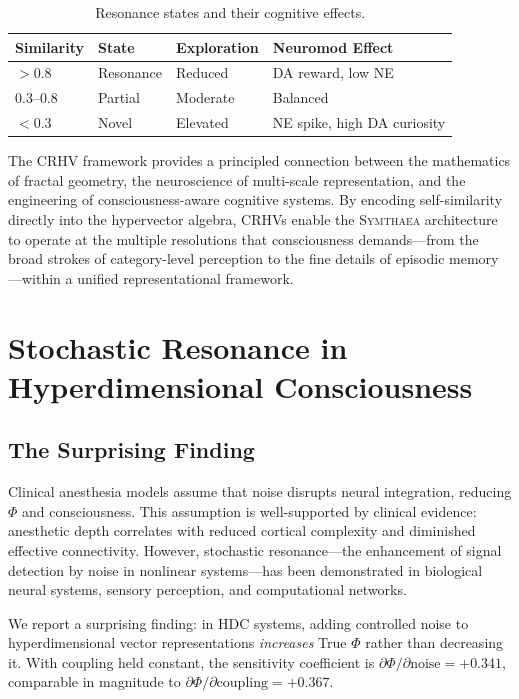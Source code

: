 \documentclass[12pt]{book}
\newcommand{\symthaea}{\textsc{Symthaea}}
\begin{document}
\begin{table}[htbp]
\centering
\caption{Resonance states and their cognitive effects.}
\label{tab:resonance-states}
\begin{tabular}{@{}llll@{}}
\toprule
\textbf{Similarity} & \textbf{State} & \textbf{Exploration} & \textbf{Neuromod Effect} \\
\midrule
$> 0.8$        & Resonance  & Reduced     & DA reward, low NE \\
$0.3$--$0.8$   & Partial    & Moderate    & Balanced \\
$< 0.3$        & Novel      & Elevated    & NE spike, high DA curiosity \\
\bottomrule
\end{tabular}
\end{table}

The CRHV framework provides a principled connection between the mathematics of fractal geometry, the neuroscience of multi-scale representation, and the engineering of consciousness-aware cognitive systems. By encoding self-similarity directly into the hypervector algebra, CRHVs enable the \symthaea{} architecture to operate at the multiple resolutions that consciousness demands---from the broad strokes of category-level perception to the fine details of episodic memory---within a unified representational framework.


\chapter{Stochastic Resonance in Hyperdimensional Consciousness}
\label{ch:sr}

\section{The Surprising Finding}

Clinical anesthesia models assume that noise disrupts neural integration, reducing $\Phi$ and consciousness. This assumption is well-supported by clinical evidence: anesthetic depth correlates with reduced cortical complexity and diminished effective connectivity. However, stochastic resonance---the enhancement of signal detection by noise in nonlinear systems---has been demonstrated in biological neural systems, sensory perception, and computational networks.

We report a surprising finding: in HDC systems, adding controlled noise to hyperdimensional vector representations \textit{increases} True $\Phi$ rather than decreasing it. With coupling held constant, the sensitivity coefficient is $\partial\Phi/\partial\text{noise} = +0.341$, comparable in magnitude to $\partial\Phi/\partial\text{coupling} = +0.367$.
\end{document}
